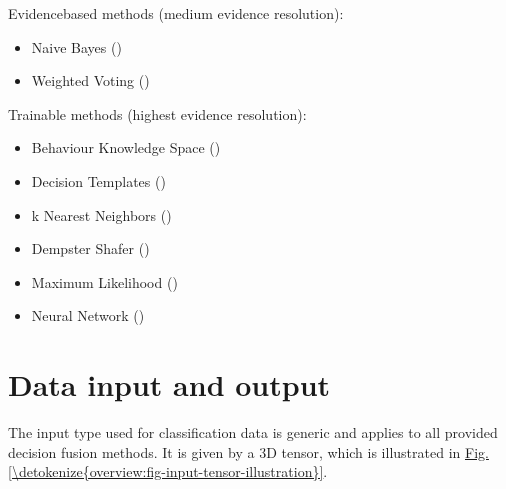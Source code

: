 \documentclass[letterpaper,10pt,english]{sphinxmanual}
\begin{document}
\sphinxAtStartPar
Evidence\sphinxhyphen{}based methods (medium evidence resolution):
\begin{itemize}
\item {} 
\sphinxAtStartPar
Naive Bayes ({\hyperref[\detokenize{pusion.core.naive_bayes_combiner:nb-cref}]{}})

\item {} 
\sphinxAtStartPar
Weighted Voting ({\hyperref[\detokenize{pusion.core.weighted_voting_combiner:wv-cref}]{}})

\end{itemize}

\sphinxAtStartPar
Trainable methods (highest evidence resolution):
\begin{itemize}
\item {} 
\sphinxAtStartPar
Behaviour Knowledge Space ({\hyperref[\detokenize{pusion.core.behaviour_knowledge_space_combiner:bks-cref}]{}})

\item {} 
\sphinxAtStartPar
Decision Templates ({\hyperref[\detokenize{pusion.core.decision_templates_combiner:dt-cref}]{}})

\item {} 
\sphinxAtStartPar
k Nearest Neighbors ({\hyperref[\detokenize{pusion.core.k_nearest_neighbors_combiner:knn-cref}]{}})

\item {} 
\sphinxAtStartPar
Dempster Shafer ({\hyperref[\detokenize{pusion.core.dempster_shafer_combiner:ds-cref}]{}})

\item {} 
\sphinxAtStartPar
Maximum Likelihood ({\hyperref[\detokenize{pusion.core.maximum_likelihood_combiner:mle-cref}]{}})

\item {} 
\sphinxAtStartPar
Neural Network ({\hyperref[\detokenize{pusion.core.neural_network_combiner:nn-cref}]{}})

\end{itemize}


\section{Data input and output}
\label{\detokenize{overview:data-input-and-output}}
\sphinxAtStartPar
The input type used for classification data is generic and applies to all provided decision fusion methods.
It is given by a 3D  tensor,
which is illustrated in \hyperref[\detokenize{overview:fig-input-tensor-illustration}]{Fig.\@ \ref{\detokenize{overview:fig-input-tensor-illustration}}}.
\end{document}
